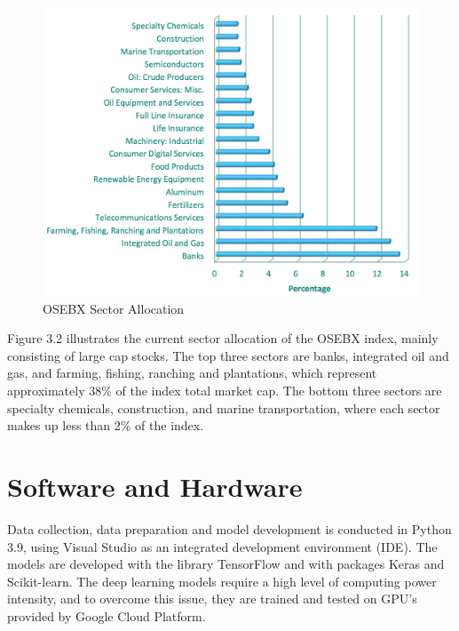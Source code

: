\indent\newline 
\begin{figure}[H]
\centering
\includegraphics [scale=0.44,angle=360]{figures/largesector.png}
\caption{OSEBX Sector Allocation \cite{bors}}
\label{fig:largesector}
\end{figure}
\indent\newline 
Figure 3.2 illustrates the current sector allocation of the OSEBX index, mainly consisting of large cap stocks. The top three sectors are banks, integrated oil and gas, and farming, fishing, ranching and plantations, which represent approximately 38\% of the index total market cap. The bottom three sectors are specialty chemicals, construction, and marine transportation, where each sector makes up less than 2\% of the index.  

\section{Software and Hardware}  
Data collection, data preparation and model development is conducted in Python 3.9, using Visual Studio as an integrated development environment (IDE). The models are developed with the library TensorFlow and with packages Keras and Scikit-learn. The deep learning models require a high level of computing power intensity, and to overcome this issue, they are trained and tested on GPU's provided by Google Cloud Platform.  







